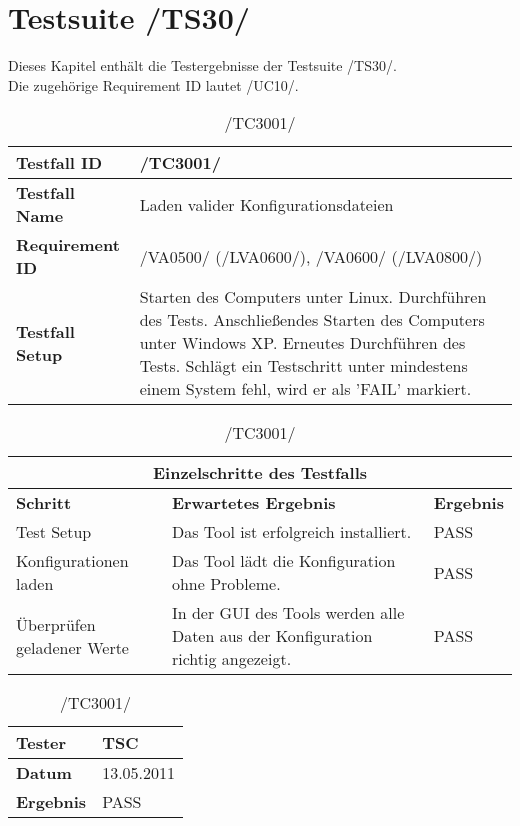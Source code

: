 \chapter{Testsuite /TS30/}
Dieses Kapitel enthält die Testergebnisse der Testsuite /TS30/.\\
Die zugehörige Requirement ID lautet /UC10/.

\begin{table}[h]
\caption{/TC3001/}
\label{tab:TC3001}
\begin{center}
\begin{tabular}{|p{3.5cm}|p{11cm}|}
\hline
\textbf{Testfall ID} & /TC3001/\\
\hline
\textbf{Testfall Name} & Laden valider Konfigurationsdateien\\
\hline
\textbf{Requirement ID} & /VA0500/ (/LVA0600/), /VA0600/ (/LVA0800/)\\
\hline
\textbf{Testfall Setup} & Starten des Computers unter Linux. Durchführen des Tests.
Anschließendes Starten des Computers unter Windows XP. Erneutes Durchführen des Tests. Schlägt ein Testschritt unter mindestens einem System fehl, wird er als 'FAIL' markiert.\\
\hline
\end{tabular}
\begin{tabular}{|p{4cm}|p{7.8cm}|p{2.3cm}|}
\multicolumn{3}{|c|}{\textbf{Einzelschritte des Testfalls}} \\
\hline
\textbf{Schritt} & \textbf{Erwartetes Ergebnis} & \textbf{Ergebnis}\\
\hline
Test Setup & Das Tool ist erfolgreich installiert. & PASS\\
\hline
Konfigurationen laden &  Das Tool lädt die Konfiguration ohne Probleme. &
PASS\\
\hline
Überprüfen geladener Werte & In der GUI des Tools werden alle Daten aus der
Konfiguration richtig angezeigt. & PASS\\
\hline
\end{tabular}

\begin{tabular}{|p{3.5cm}|p{11cm}|}
\textbf{Tester} & TSC\\
\hline
\textbf{Datum} & 13.05.2011\\
\hline
\textbf{Ergebnis} & PASS\\
\hline
\end{tabular}
\end{center}
\label{default}
\end{table}

